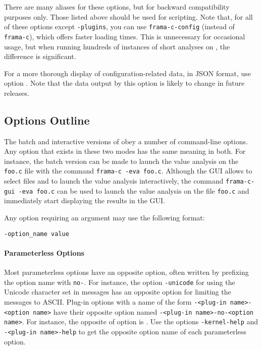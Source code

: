 There are many aliases for these options, but for backward compatibility purposes only.
Those listed above should be used for scripting.
Note that, for all of these options except \texttt{-plugins},
you can use \texttt{frama-c-config} (instead of \texttt{frama-c}),
which offers faster loading times.
This is unnecessary for occasional usage, but when running hundreds of
instances of short analyses on \FramaC, the difference is significant.

For a more thorough display of configuration-related data, in JSON format,
use option . Note that the data output by this
option is likely to change in future releases.

\subsection{Options Outline}

The batch and interactive versions of \FramaC obey a number of
command-line options. Any option that exists in these two modes
has the same meaning in both.
For instance, the batch version can be made to launch the value analysis
on the \verb|foo.c| file with the command \verb|frama-c -eva foo.c|.
Although the GUI allows to select files and to
launch the value analysis interactively, the
command \verb|frama-c-gui -eva foo.c| can be used to launch the value
analysis on the file \verb|foo.c| and immediately start displaying the results
in the GUI.

Any option requiring an argument may use the following
format:
\begin{commands}
\texttt{-option\_name value}
\end{commands}

\paragraph{Parameterless Options}

Most parameterless options have an opposite option, often written by prefixing
the option name with \texttt{no-}.  For instance, the option \verb|-unicode|
for using the Unicode character set in messages has an opposite option
 for limiting the messages to ASCII.  Plug-in options
with
a name of the form \texttt{-<plug-in name>-<option name>} have their opposite
option named \texttt{-<plug-in name>-no-<option name>}. For instance, the
opposite of option  is .
Use the options \texttt{-kernel-help} and
\texttt{-<plug-in name>-help} to get the opposite option name of each
parameterless option.

